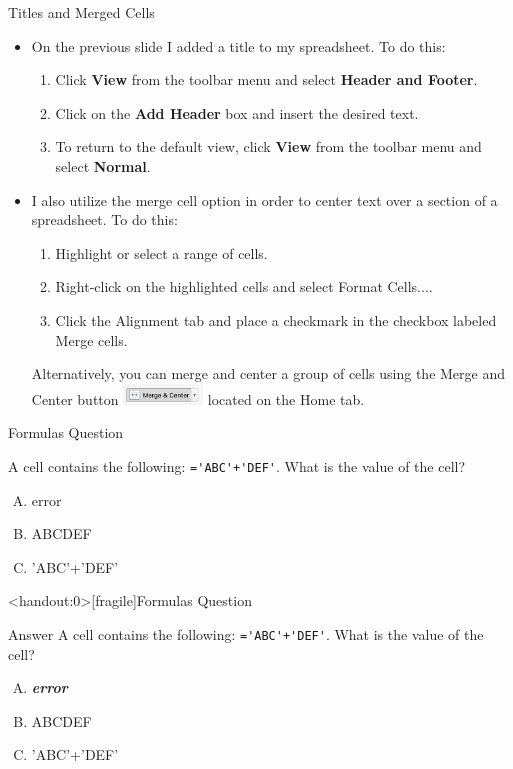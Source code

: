 \documentclass[xcolor=svgnames]{beamer}
\newcommand{\answer}[1]{\textit{\textbf{\textcolor{iyellow}{#1}}}}
\begin{document}
\begin{frame}{Titles and Merged Cells}
\begin{itemize}
\item On the previous slide I added a title to my spreadsheet.  To do this:
\begin{enumerate}
\item Click {\bf View} from the toolbar menu and select {\bf Header and Footer}.
\item Click on the {\bf Add Header} box and insert the desired text.
\item To return to the default view, click {\bf View} from the toolbar menu and select {\bf Normal}. 
\end{enumerate}
\item I also utilize the merge cell option in order to  center text  over a  section of a spreadsheet. To do this:
\begin{enumerate}
\item Highlight or select a range of cells.
\item Right-click on the highlighted cells and select Format Cells....
\item Click the Alignment tab and place a checkmark in the checkbox labeled Merge cells.
\end{enumerate}
Alternatively, you can merge and center a group of cells  using  the Merge and Center button \includegraphics[height=1.5em]{mergeandcenter} located on the Home tab.
\end{itemize}
\end{frame}




\begin{frame}[fragile]{Formulas Question}
\begin{example}
 A cell contains the following: \verb|='ABC'+'DEF'|. What is the value of the cell?
\begin{enumerate}[A)]
\item  error
\item  ABCDEF
\item  'ABC'+'DEF'
\end{enumerate}
\end{example}
\end{frame}



\begin{frame}<handout:0>[fragile]{Formulas Question}
\begin{block}{Answer}
 A cell contains the following: \verb|='ABC'+'DEF'|. What is the value of the cell?
\begin{enumerate}[A)]
\item  \answer{error}
\item  ABCDEF
\item  'ABC'+'DEF'
\end{enumerate}
\end{block}
\end{frame}
\end{document}
